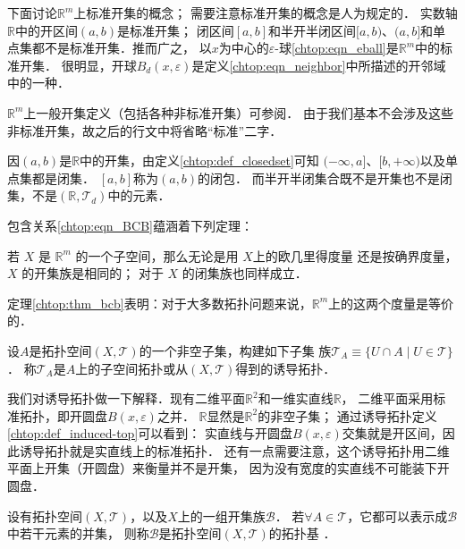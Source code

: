 下面讨论$\mathbb{R}^m$上{\heiti 标准开集}的概念；
需要注意{\kaishu 标准开集}的概念是人为规定的．
实数轴$\mathbb{R}$中的开区间$(a,b)$是{\kaishu 标准开集}；
闭区间$[a,b]$和半开半闭区间$[a,b)$、$(a,b]$和单点集都不是标准开集．推而广之，
以$x$为中心的$\varepsilon$-球\eqref{chtop:eqn_eball}是$\mathbb{R}^m$中的{\kaishu 标准开集}．
很明显，开球$B_{d}(x,\varepsilon)$是定义\ref{chtop:eqn_neighbor}中所描述的{\kaishu 开邻域}中的一种．

$\mathbb{R}^m$上一般开集定义（包括各种非标准开集）可参阅\parencite[\S 12,\S 13]{munkres-2000-topology}．
由于我们基本不会涉及这些非标准开集，故之后的行文中将省略“标准”二字．

因$(a,b)$是$\mathbb{R}$中的开集，由定义\ref{chtop:def_closedset}可知
$(-\infty, a]$、$[b,+\infty)$以及单点集都是闭集．
$[a,b]$称为$(a,b)$的{\kaishu 闭包}．
而半开半闭集合既不是开集也不是闭集，不是$(\mathbb{R},\mathscr{T}_d)$中的元素．

包含关系\eqref{chtop:eqn_BCB}蕴涵着下列定理：
\begin{theorem}\label{chtop:thm_bcb}
    若 $X$ 是 $\mathbb{R}^m$ 的一个子空间，那么无论是用 $X$上的欧几里得度量
    还是按确界度量，$X$ 的开集族是相同的； 对于 $X$ 的闭集族也同样成立．    
\end{theorem}

定理\ref{chtop:thm_bcb}表明：对于大多数拓扑问题来说，$\mathbb{R}^m$上的这两个度量是等价的．




\begin{definition}\label{chtop:def_induced-top}
    设$A$是拓扑空间$(X,\mathscr{T})$的一个非空子集，构建如下子集
    族$\mathscr{T} _A \equiv \{U\cap A \mid U\in \mathscr{T}\}$．
    称$\mathscr{T}_A$是$A$上的{\heiti 子空间拓扑}或从$(X,\mathscr{T})$得到的{\heiti 诱导拓扑}．
\end{definition}

我们对诱导拓扑做一下解释．现有二维平面$\mathbb{R}^2$和一维实直线$\mathbb{R}$，
二维平面采用标准拓扑，即开圆盘$B(x,\varepsilon)$之并．
$\mathbb{R}$显然是$\mathbb{R}^2$的非空子集；
通过诱导拓扑定义\ref{chtop:def_induced-top}可以看到：
实直线与开圆盘$B(x,\varepsilon)$交集就是开区间，因此诱导拓扑就是实直线上的标准拓扑．
还有一点需要注意，这个诱导拓扑用二维平面上开集（开圆盘）来衡量并不是开集，
因为没有宽度的实直线不可能装下开圆盘．


\begin{definition}\label{chtop:def_bases}
    设有拓扑空间$(X,\mathscr{T})$，以及$X$上的一组开集族$\mathscr{B}$．
    若$\forall A \in \mathscr{T}$，它都可以表示成$\mathscr{B}$中若干元素的并集，
    则称$\mathscr{B}$是拓扑空间$(X,\mathscr{T})$的{\heiti 拓扑基 }．%
\end{definition}

